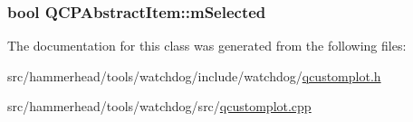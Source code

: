\subsubsection[{\texorpdfstring{m\+Selected}{mSelected}}]{\setlength{\rightskip}{0pt plus 5cm}bool Q\+C\+P\+Abstract\+Item\+::m\+Selected\hspace{0.3cm}{\ttfamily [protected]}}\hypertarget{classQCPAbstractItem_a4bdb3457dad1d268c0f78a44152b9645}{}\label{classQCPAbstractItem_a4bdb3457dad1d268c0f78a44152b9645}


The documentation for this class was generated from the following files\+:\begin{DoxyCompactItemize}
\item 
src/hammerhead/tools/watchdog/include/watchdog/\hyperlink{qcustomplot_8h}{qcustomplot.\+h}\item 
src/hammerhead/tools/watchdog/src/\hyperlink{qcustomplot_8cpp}{qcustomplot.\+cpp}\end{DoxyCompactItemize}
